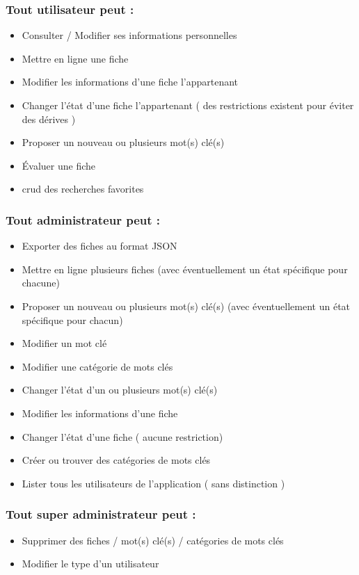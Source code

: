 \subsubsection*{Tout utilisateur peut : }
\begin{itemize}
    \item Consulter / Modifier ses informations personnelles
    \item Mettre en ligne une fiche
    \item Modifier les informations d'une fiche l'appartenant
    \item Changer l'état d'une fiche l'appartenant ( des restrictions existent pour éviter des dérives )
    \item Proposer un nouveau ou plusieurs mot(s) clé(s)
    \item Évaluer une fiche 
    \item \Gls{crud} des recherches favorites
\end{itemize}

\subsubsection*{Tout administrateur peut : }
\begin{itemize}
    \item Exporter des fiches au format JSON
    \item Mettre en ligne plusieurs fiches (avec éventuellement un état spécifique pour chacune)
    \item Proposer un nouveau ou plusieurs mot(s) clé(s) (avec éventuellement un état spécifique pour chacun)
    \item Modifier un mot clé
    \item Modifier une catégorie de mots clés
    \item Changer l'état d'un ou plusieurs mot(s) clé(s)
    \item Modifier les informations d'une fiche
    \item Changer l'état d'une fiche ( aucune restriction)
    \item Créer ou trouver des catégories de mots clés
    \item Lister tous les utilisateurs de l'application ( sans distinction )
\end{itemize}

\subsubsection*{Tout super administrateur peut : }
\begin{itemize}
    \item Supprimer des fiches / mot(s) clé(s) / catégories de mots clés
    \item Modifier le type d'un utilisateur
\end{itemize}

